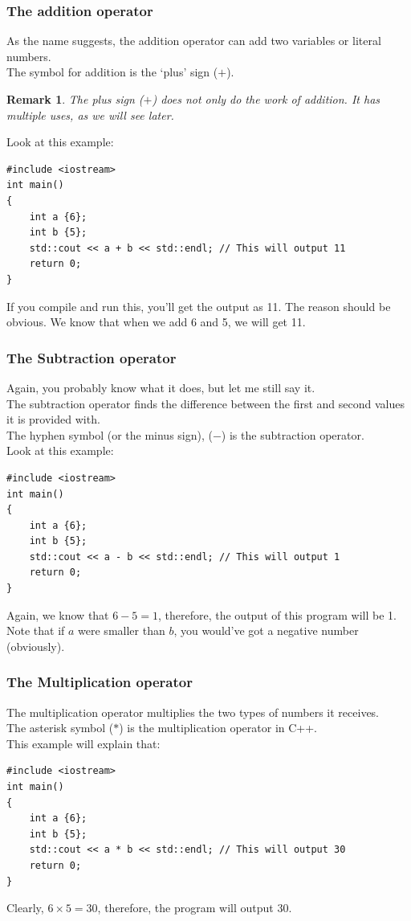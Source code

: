 \documentclass[letterpaper, 12pt]{book}
\newtheorem{remark}{Remark}
\begin{document}
\subsubsection{The addition operator}
As the name suggests, the addition operator can add two variables or literal numbers.\\
The symbol for addition is the `plus' sign ($+$).
\begin{remark}
	The plus sign ($+$) does not only do the work of addition. It has multiple uses, as we will see later.
\end{remark}
Look at this example:
\begin{lstlisting}
#include <iostream>
int main()
{
	int a {6};
	int b {5};
	std::cout << a + b << std::endl; // This will output 11
	return 0;
}
\end{lstlisting}
If you compile and run this, you'll get the output as 11. The reason should be obvious. We know that when we add 6 and 5, we will get 11.
\subsubsection{The Subtraction operator}
Again, you probably know what it does, but let me still say it.\\
The subtraction operator finds the difference between the first and second values it is provided with.\\
The hyphen symbol (or the minus sign), ($-$) is the subtraction operator.\\
Look at this example:
\begin{lstlisting}
#include <iostream>
int main()
{
	int a {6};
	int b {5};
	std::cout << a - b << std::endl; // This will output 1
	return 0;
}
\end{lstlisting}
Again, we know that $6 - 5 = 1$, therefore, the output of this program will be 1. Note that if $a$ were smaller than $b$, you would've got a negative number (obviously).
\subsubsection{The Multiplication operator}
The multiplication operator multiplies the two types of numbers it receives.\\
The asterisk symbol ($*$) is the multiplication operator in C++.\\
This example will explain that:
\begin{lstlisting}
#include <iostream>
int main()
{
	int a {6};
	int b {5};
	std::cout << a * b << std::endl; // This will output 30
	return 0;
}
\end{lstlisting}
Clearly, $6 \times 5 = 30$, therefore, the program will output 30.
\end{document}
